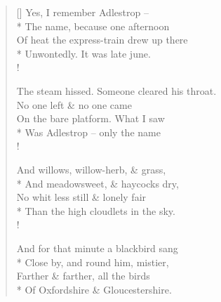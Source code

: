 \documentclass[MAIN]{subfiles}
\begin{document}
\settowidth{\versewidth}{The steam hissed. Someone cleared his throat.}
\begin{verse}[\versewidth]
Yes, I remember {\sc Adlestrop} --\\*
\vin The name, because one afternoon\\
Of heat the express-train drew up there\\*
\vin Unwontedly. It was late june.\\!

The steam hissed. Someone cleared his throat.\\
\vin No one left \& no one came\\
On the bare platform. What I saw\\*
\vin Was {\sc Adlestrop} -- only the name\\!

And willows, willow-herb, \& grass,\\*
\vin And meadowsweet, \& haycocks dry,\\
No whit less still \& lonely fair\\*
\vin Than the high cloudlets in the sky.\\!

And for that minute a blackbird sang\\*
\vin Close by, and round him, mistier,\\
Farther \& farther, all the birds\\*
\vin Of Oxfordshire \& Gloucestershire.
\end{verse}
\end{document}
